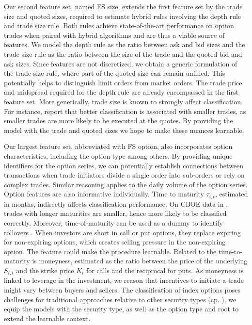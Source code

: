 Our second feature set, named \gls{FS} size, extends the first feature set by the trade size and quoted sizes, required to estimate hybrid rules involving the depth rule and trade size rule. Both rules achieve state-of-the-art performance on option trades when paired with hybrid algorithms and are thus a viable source of features. We model the depth rule as the ratio between ask and bid sizes and the trade size rule as the ratio between the size of the trade and the quoted bid and ask sizes. Since features are not discretized, we obtain a generic formulation of the trade size rule, where part of the quoted size can remain unfilled. This potentially helps to distinguish limit orders from market orders. The trade price and midspread required for the depth rule are already encompassed in the first feature set. More generically, trade size is known to strongly affect classification. For instance, \textcites[\checkmark][889]{savickasInferringDirectionOption2003}[\checkmark][537]{ellisAccuracyTradeClassification2000} report that better classification is associated with smaller trades, as smaller trades are more likely to be executed at the quotes. By providing the model with the trade and quoted sizes we hope to make these nuances learnable.

Our largest feature set, abbreviated with \gls{FS} option, also incorporates option characteristics, including the option type among others. By providing unique identifiers for the option series, we can potentially establish connections between transactions when trade initiators divide a single order into sub-orders or rely on complex trades. Similar reasoning applies to the daily volume of the option series. Option features are also informative individually. Time to maturity $\tau_{i,t}$, estimated in months, indirectly affects classification performance. On \gls{CBOE} data in \textcite[\checkmark][889]{savickasInferringDirectionOption2003}, trades with longer maturities are smaller, hence more likely to be classified correctly. Moreover, time-of-maturity can be used as a dummy to identify rollovers \autocite[\checkmark][700]{muravyevOrderFlowExpected2016}. When investors are short in call or put options, they replace expiring for non-expiring options, which creates selling pressure in the non-expiring option. The feature could make the procedure learnable. Related to the time-to-maturity is moneyness, estimated as the ratio between the price of the underlying $S_{i,t}$ and the strike price $K_{i}$ for calls and the reciprocal for puts. As moneyness is linked to leverage in the investment, we reason that incentives to initiate a trade might vary between buyers and sellers. The classification of index options poses challenges for traditional approaches relative to other security types (cp. \textcites[\checkmark][22]{grauerOptionTradeClassification2022}[\checkmark][898-899]{savickasInferringDirectionOption2003}), we equip the models with the security type, as well as the option type and root to extend the learnable context.

